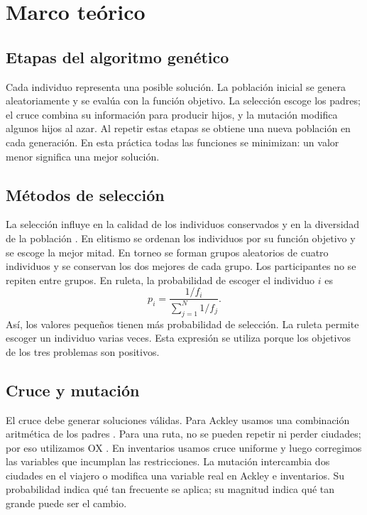 \documentclass[conference]{IEEEtran}
\begin{document}
\section{Marco teórico}
\subsection{Etapas del algoritmo genético}
Cada individuo representa una posible solución. La población inicial se genera aleatoriamente y se evalúa con la función objetivo. La selección escoge los padres; el cruce combina su información para producir hijos, y la mutación modifica algunos hijos al azar. Al repetir estas etapas se obtiene una nueva población en cada generación. En esta práctica todas las funciones se minimizan: un valor menor significa una mejor solución.

\subsection{Métodos de selección}
La selección influye en la calidad de los individuos conservados y en la diversidad de la población \cite{ref2}. En elitismo se ordenan los individuos por su función objetivo y se escoge la mejor mitad. En torneo se forman grupos aleatorios de cuatro individuos y se conservan los dos mejores de cada grupo. Los participantes no se repiten entre grupos. En ruleta, la probabilidad de escoger el individuo $i$ es
\begin{equation}
 p_i=\frac{1/f_i}{\sum_{j=1}^{N}1/f_j}.
\end{equation}
Así, los valores pequeños tienen más probabilidad de selección. La ruleta permite escoger un individuo varias veces. Esta expresión se utiliza porque los objetivos de los tres problemas son positivos.

\subsection{Cruce y mutación}
El cruce debe generar soluciones válidas. Para Ackley usamos una combinación aritmética de los padres \cite{ref3}. Para una ruta, no se pueden repetir ni perder ciudades; por eso utilizamos OX \cite{ref4}. En inventarios usamos cruce uniforme \cite{ref7} y luego corregimos las variables que incumplan las restricciones. La mutación intercambia dos ciudades en el viajero o modifica una variable real en Ackley e inventarios. Su probabilidad indica qué tan frecuente se aplica; su magnitud indica qué tan grande puede ser el cambio.
\end{document}
